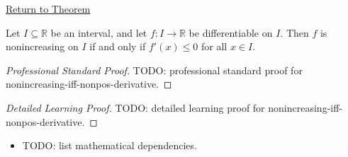 \newpage
{}
\label{prf:nonincreasing-iff-nonpos-derivative}

\begin{remark*}[Return]
\hyperref[thm:nonincreasing-iff-nonpos-derivative]{Return to Theorem}
\end{remark*}

\begin{theorem*}
Let $I \subseteq \mathbb{R}$ be an interval, and let $f : I \to \mathbb{R}$ be differentiable on $I$. Then $f$ is nonincreasing on $I$ if and only if $f'(x) \leq 0$ for all $x \in I$.
\end{theorem*}

\begin{proof}[Professional Standard Proof]
\LRAProofBodyStart
TODO: professional standard proof for nonincreasing-iff-nonpos-derivative.
\end{proof}

\begin{proof}[Detailed Learning Proof]
\LRAProofBodyStart
TODO: detailed learning proof for nonincreasing-iff-nonpos-derivative.
\end{proof}

\begin{remark*}
\end{remark*}

\begin{dependencies}
\begin{itemize}
  \item TODO: list mathematical dependencies.
\end{itemize}
\end{dependencies}

\clearpage
